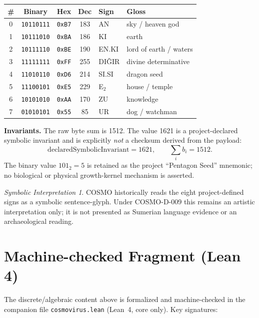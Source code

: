 \documentclass[11pt]{article}
\theoremstyle{definition}
\theoremstyle{plain}
\theoremstyle{remark}
\newtheorem*{interp}{Symbolic Interpretation}
\begin{document}
\begin{center}
\renewcommand{\arraystretch}{1.25}
\begin{tabular}{@{}c c c c l l@{}}
\toprule
\# & Binary & Hex & Dec & Sign & Gloss \\
\midrule
0 & \texttt{10110111} & \texttt{0xB7} & 183 & AN     & sky / heaven god \\
1 & \texttt{10111010} & \texttt{0xBA} & 186 & KI     & earth \\
2 & \texttt{10111110} & \texttt{0xBE} & 190 & EN.KI  & lord of earth / waters \\
3 & \texttt{11111111} & \texttt{0xFF} & 255 & DI\v{G}IR & divine determinative \\
4 & \texttt{11010110} & \texttt{0xD6} & 214 & SI.SI  & dragon seed \\
5 & \texttt{11100101} & \texttt{0xE5} & 229 & E$_2$  & house / temple \\
6 & \texttt{10101010} & \texttt{0xAA} & 170 & ZU     & knowledge \\
7 & \texttt{01010101} & \texttt{0x55} &  85 & UR     & dog / watchman \\
\bottomrule
\end{tabular}
\end{center}

\noindent
\textbf{Invariants.} The raw byte sum is 1512. The value 1621 is a
project-declared symbolic invariant and is explicitly \emph{not} a checksum
derived from the payload:
\begin{equation}
  \mathrm{declaredSymbolicInvariant}=1621,
  \qquad
  \textstyle\sum_i b_i = 1512.
\end{equation}
The binary value $101_2=5$ is retained as the project ``Pentagon Seed''
mnemonic; no biological or physical growth-kernel mechanism is asserted.

\begin{interp}
COSMO historically reads the eight project-defined signs as a symbolic
sentence-glyph. Under COSMO-D-009 this remains an artistic interpretation only;
it is not presented as Sumerian language evidence or an archaeological reading.
\end{interp}

\section{Machine-checked Fragment (Lean 4)}
The discrete/algebraic content above is formalized and machine-checked in the
companion file \texttt{cosmovirus.lean} (Lean~4, core only). Key signatures:
\end{document}
